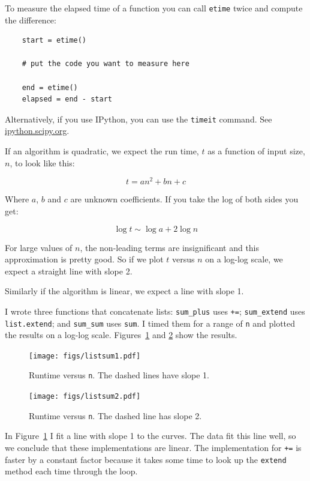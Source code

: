 \documentclass[10pt]{book}
\begin{document}
To measure the elapsed time of a function you can call
{\tt etime} twice and compute the difference:

\begin{verbatim}
    start = etime()

    # put the code you want to measure here

    end = etime()
    elapsed = end - start
\end{verbatim}

Alternatively, if you use IPython, you can use the
{\tt timeit} command. See \url{ipython.scipy.org}.

If an algorithm is quadratic, we expect the run time, $t$
as a function of input size, $n$, to look like this:

\[ t = a n^2 + b n + c \]

Where $a$, $b$ and $c$ are unknown coefficients.  If you take
the log of both sides you get:

\[ \log t \sim \log a + 2 \log n \]

For large values of $n$, the non-leading terms are insignificant
and this approximation is pretty good.  So if we plot $t$
versus $n$ on a log-log scale, we expect a straight line
with slope 2.

Similarly if the algorithm is linear, we expect a line with
slope 1.

I wrote three functions that concatenate lists: \verb"sum_plus" uses
{\tt +=}; \verb"sum_extend" uses {\tt list.extend}; and \verb"sum_sum"
uses {\tt sum}.  I timed them for a range of {\tt n} and plotted the
results on a log-log scale.  Figures~\ref{listsum1} and \ref{listsum2}
show the results.

\begin{figure}
\centerline{\texttt{[image: figs/listsum1.pdf]}}
\caption{Runtime versus {\tt n}.  The dashed lines have slope 1.\label{listsum1}}
\end{figure}

\begin{figure}
\centerline{\texttt{[image: figs/listsum2.pdf]}}
\caption{Runtime versus {\tt n}.  The dashed line has slope 2.\label{listsum2}}
\end{figure}

In Figure~\ref{listsum1} I fit a line with slope 1 to the curves.
The data fit this line well, so we conclude
that these implementations are linear.  The implementation for {\tt +=}
is faster by a constant factor because it takes some time
to look up the {\tt extend} method each time through the loop.
\end{document}

